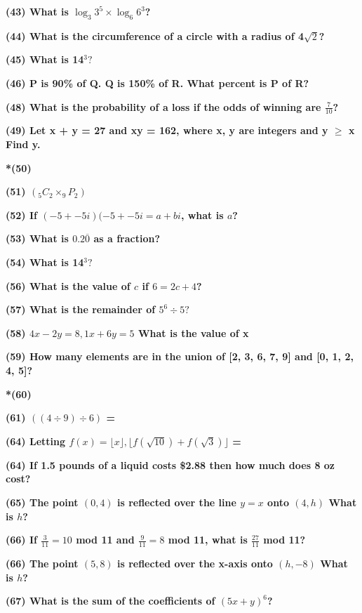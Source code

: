 \documentclass{article}
\begin{document}
{\begin{multicols}{2}
\begin{flushleft}
\textbf{(43) What is $\log_{3}3^{5} \times \log_{6}6^{3}$?\hrulefill}

\textbf{(44) What is the circumference of a circle with a radius of 4$\sqrt{2}$?\hrulefill}

\textbf{(45) What is 14$^{3}?$\hrulefill}

\textbf{(46) P is 90\% of Q. Q is 150\% of R. What percent is P of R?\hrulefill}

\textbf{(48) What is the probability of a loss if the odds of winning are $\frac{7}{10}$?\hrulefill}

\textbf{(49) Let x + y = 27 and xy = 162, where x, y are integers and y $\geq$ x Find y.\hrulefill}

\textbf{*(50) \hrulefill}

\textbf{(51) $(_{5}C_{2} \times _{9}P_{2})$\hrulefill}

\textbf{(52) If $(-5+-5i)(-5+-5i = a + bi$, what is $a$?\hrulefill}

\textbf{(53) What is $0.2\overline{0}$ as a fraction?\hrulefill}

\textbf{(54) What is 14$^{3}?$\hrulefill}

\textbf{(56) What is the value of $c$ if $6 = 2c + 4$?\hrulefill}

\textbf{(57) What is the remainder of $5^{6}\div5?$\hrulefill}

\textbf{(58) $4x - 2y = 8 , 1x + 6y = 5$ What is the value of  x \hrulefill}

\textbf{(59) How many elements are in the union of [2, 3, 6, 7, 9] and [0, 1, 2, 4, 5]?\hrulefill}

\textbf{*(60) \hrulefill}

\textbf{(61) $((4 \div 9) \div 6)$ = \hrulefill}

\textbf{(64) Letting $f(x) = \lfloor x \rfloor, \lfloor f(\sqrt{10}) + f(\sqrt{3})\rfloor$ = \hrulefill}

\textbf{(64) If 1.5 pounds of a liquid costs \$2.88 then how much does 8 oz cost?\hrulefill}

\textbf{(65) The point $(0, 4)$ is reflected over the line $y = x$ onto $(4, h)$ What is $h$?\hrulefill}

\textbf{(66) If $\frac{3}{11} = 10$ mod 11 and $\frac{9}{11} = 8$ mod 11, what is $\frac{27}{11}$ mod 11?\hrulefill}

\textbf{(66) The point $(5, 8)$ is reflected over the x-axis onto $(h, -8)$ What is $h$?\hrulefill}

\textbf{(67) What is the sum of the coefficients of $(5x+y)^6$?\hrulefill}


\end{flushleft}
\end{multicols}}
\end{document}

